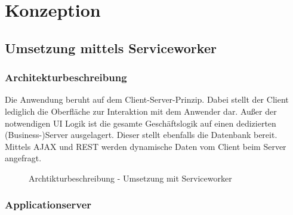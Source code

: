 \chapter{Konzeption}
\label{sec_konzeption}

\section{Umsetzung mittels Serviceworker}
\label{subsec_konzeption_serviceworker}

\subsection{Architekturbeschreibung}
\label{subsubsec_konzeption_serviceworker_architektur}

Die Anwendung beruht auf dem Client-Server-Prinzip. Dabei stellt der Client lediglich die Oberfläche zur Interaktion mit dem Anwender dar. Außer der notwendigen UI Logik ist die gesamte Geschäftslogik auf einen dedizierten (Business-)Server ausgelagert. Dieser stellt ebenfalls die Datenbank bereit. Mittels AJAX und REST werden dynamische Daten vom Client beim Server angefragt.

\begin{figure}[htp] 
\caption{Archtikturbeschreibung - Umsetzung mit Serviceworker}
\label{image_architektur-serviceworker-push}
\end{figure} 

\newpage
\subsection{Applicationserver}
\label{subsec_konzeption_applicationserver}

